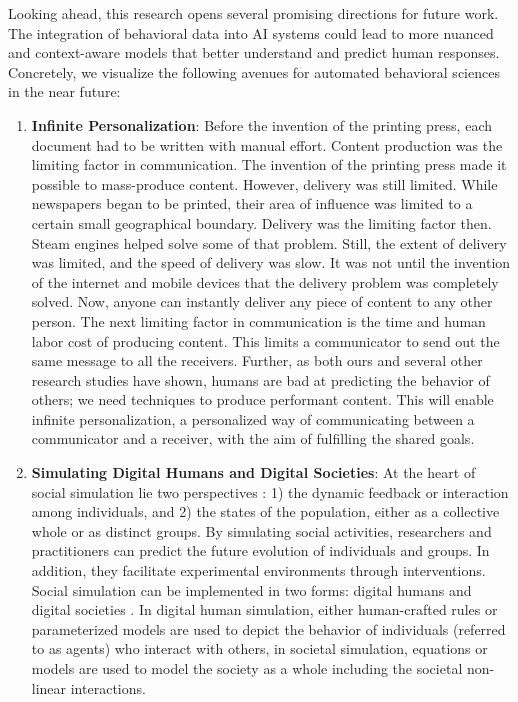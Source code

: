 Looking ahead, this research opens several promising directions for future work. The integration of behavioral data into AI systems could lead to more nuanced and context-aware models that better understand and predict human responses. Concretely, we visualize the following avenues for automated behavioral sciences in the near future:
\begin{enumerate}
    \item \textbf{Infinite Personalization}: Before the invention of the printing press, each document had to be written with manual effort. Content production was the limiting factor in communication. The invention of the printing press made it possible to mass-produce content. However, delivery was still limited. While newspapers began to be printed, their area of influence was limited to a certain small geographical boundary. Delivery was the limiting factor then. Steam engines helped solve some of that problem. Still, the extent of delivery was limited, and the speed of delivery was slow. It was not until the invention of the internet and mobile devices that the delivery problem was completely solved. Now, anyone can instantly deliver any piece of content to any other person. The next limiting factor in communication is the time and human labor cost of producing content. This limits a communicator to send out the same message to all the receivers. Further, as both ours and several other research studies have shown, humans are bad at predicting the behavior of others; we need techniques to produce performant content. This will enable infinite personalization, a personalized way of communicating between a communicator and a receiver, with the aim of fulfilling the shared goals.

    

    \item \textbf{Simulating Digital Humans and Digital Societies}: At the heart of social simulation lie two perspectives \cite{gilbert2005simulation}: 1) the dynamic feedback or interaction among individuals, and 2) the states of the population, either as a collective whole or as distinct groups. By simulating social activities, researchers and practitioners can predict the future evolution of individuals and groups. In addition, they facilitate experimental environments through interventions. Social simulation can be implemented in two forms: digital humans \cite{park2023generative,chopard1998cellular,Argyle_2023} and digital societies \cite{khandelwal2023large,bhattacharyyasocia2024,si2023long,khurana2023behavior,santurkar2023whose}. In digital human simulation, either human-crafted rules or parameterized models are used to depict the behavior of individuals (referred to as agents) who interact with others, in societal simulation, equations or models are used to model the society as a whole including the societal non-linear interactions.


\end{enumerate}
